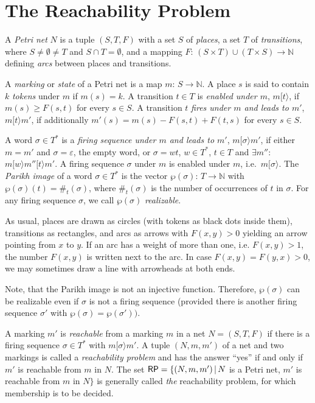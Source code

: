 \documentclass{LMCS}
\newcommand{\step}[1]{[#1\rangle}
\newcommand{\nat}{\mathbb{N}}
\newcommand{\parikh}{\wp}
\begin{document}
\section{The Reachability Problem}\label{sec2}

\begin{defi}
A {\em Petri net} $N$ is a tuple $(S,T,F)$ with a set $S$ of {\em places}, a set $T$ of {\em transitions},
where $S\neq\emptyset\neq T$ and $S\cap T=\emptyset$, and a mapping $F$: $(S\times T)\cup(T\times S)\to\nat$
defining {\em arcs} between places and transitions.

A {\em marking} or {\em state} of a Petri net is a map $m$: $S\to\nat$. A place $s$ is said to contain $k$
{\em tokens} under $m$ if $m(s)=k$. A transition $t\in T$ is 
{\em enabled under $m$}, $m\step{t}$, if $m(s)\ge F(s,t)$ for every $s\in S$. A transition $t$
{\em fires under $m$ and leads to $m'$}, $m\step{t}m'$, if additionally $m'(s)=m(s)-F(s,t)+F(t,s)$
for every $s\in S$.

A word $\sigma\in T^*$ is a {\em firing sequence under $m$ and leads to $m'$}, $m\step{\sigma}m'$,
if either $m=m'$ and $\sigma=\varepsilon$, the empty word, or $\sigma=wt$, $w\in T^*$, $t\in T$
and $\exists m''$: $m\step{w}m''\step{t}m'$. A firing sequence $\sigma$ under $m$ is enabled under $m$,
i.e.\ $m\step{\sigma}$. The {\em Parikh image} of a word $\sigma\in T^*$ is the vector
$\parikh(\sigma)$: $T\to\nat$ with $\parikh(\sigma)(t)=\#_t(\sigma)$, where $\#_t(\sigma)$ is the number of
occurrences of $t$ in $\sigma$. For any firing sequence $\sigma$, we call $\parikh(\sigma)$ {\em realizable}.
\end{defi}

As usual, places are drawn as circles (with tokens as black dots inside them), transitions as rectangles, 
and arcs as arrows with $F(x,y)>0$ yielding an arrow pointing from $x$ to $y$. If an arc has a weight of
more than one, i.e. $F(x,y)>1$, the number $F(x,y)$ is written next to the arc. In case $F(x,y)=F(y,x)>0$,
we may sometimes draw a line with arrowheads at both ends.

Note, that the Parikh image is not an injective function. Therefore, $\parikh(\sigma)$ can be realizable
even if $\sigma$ is not a firing sequence (provided there is another firing sequence $\sigma'$
with $\parikh(\sigma)=\parikh(\sigma'))$.

\begin{defi}
A marking $m'$ is {\em reachable} from a marking $m$ in a net $N=(S,T,F)$ if there is a firing sequence 
$\sigma\in T^*$ with $m\step{\sigma}m'$. A tuple $(N,m,m')$ of a net and two markings is called a
{\em reachability problem} and has the answer ``yes'' if and only if $m'$ is reachable from $m$ in $N$.
The set ${\sf RP} = \{(N,m,m')\,|\,N$ is a Petri net, $m'$ is reachable from $m$ in $N\}$ is generally 
called {\em the} reachability problem, for which membership is to be decided.
\end{defi}
\end{document}
